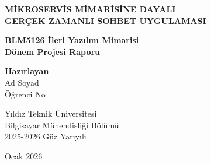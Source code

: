 \documentclass[12pt, a4paper]{report}
\begin{document}
\shorthandoff{=}

\begin{titlepage}
    \begin{center}
        \vspace*{1cm}
        
        \Huge
        \textbf{MİKROSERVİS MİMARİSİNE DAYALI\\GERÇEK ZAMANLI SOHBET UYGULAMASI}
        
        \vspace{1.5cm}
        
        \Large
        \textbf{BLM5126 İleri Yazılım Mimarisi}\\
        \textbf{Dönem Projesi Raporu}
        
        \vspace{1.5cm}
        
        \textbf{Hazırlayan}\\
        Ad Soyad\\
        Öğrenci No
        
        \vfill
        
        \Large
        Yıldız Teknik Üniversitesi\\
        Bilgisayar Mühendisliği Bölümü\\
        2025-2026 Güz Yarıyılı
        
        \vspace{0.8cm}
        
        \Large
        Ocak 2026
        
    \end{center}
\end{titlepage}

\tableofcontents
\listoffigures
\newpage








% 
% 
\end{document}
